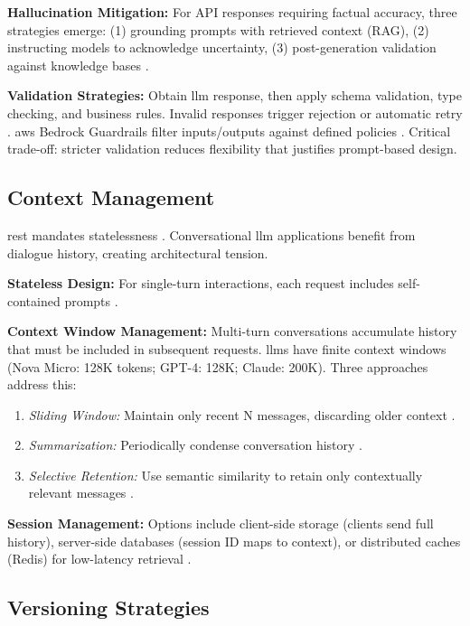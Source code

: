 \textbf{Hallucination Mitigation:} For API responses requiring factual accuracy, three strategies emerge: (1) grounding prompts with retrieved context (RAG), (2) instructing models to acknowledge uncertainty, (3) post-generation validation against knowledge bases \cite{zhou_hademif_2025}.

\textbf{Validation Strategies:} Obtain \gls{llm} response, then apply schema validation, type checking, and business rules. Invalid responses trigger rejection or automatic retry \cite{lercher_managing_2024}. \gls{aws} Bedrock Guardrails filter inputs/outputs against defined policies \cite{aws_bedrock_2025}. Critical trade-off: stricter validation reduces flexibility that justifies prompt-based design.

\subsection{Context Management}

\gls{rest} mandates statelessness \cite{fielding_architectural_2000}. Conversational \gls{llm} applications benefit from dialogue history, creating architectural tension.

\textbf{Stateless Design:} For single-turn interactions, each request includes self-contained prompts \cite{chen_prompt_2025}.

\textbf{Context Window Management:} Multi-turn conversations accumulate history that must be included in subsequent requests. \gls{llm}s have finite context windows (Nova Micro: 128K tokens; GPT-4: 128K; Claude: 200K). Three approaches address this:

\begin{enumerate}
    \item \textit{Sliding Window:} Maintain only recent N messages, discarding older context \cite{aws_api_2025}.
    \item \textit{Summarization:} Periodically condense conversation history \cite{brown_language_2020}.
    \item \textit{Selective Retention:} Use semantic similarity to retain only contextually relevant messages \cite{sahoo_systematic_2025}.
\end{enumerate}

\textbf{Session Management:} Options include client-side storage (clients send full history), server-side databases (session ID maps to context), or distributed caches (Redis) for low-latency retrieval \cite{aws_api_2025}.

\subsection{Versioning Strategies}

